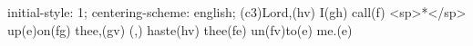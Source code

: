 initial-style: 1;
centering-scheme: english;
(c3)Lord,(hv) I(gh) call(f) <sp>*</sp> up(e)on(fg) thee,(gv) (,) haste(hv) thee(fe) un(fv)to(e) me.(e)
